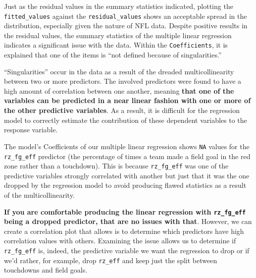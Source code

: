 \documentclass[
  letterpaper,
]{krantz}
\begin{document}
Just as the residual values in the summary statistics indicated,
plotting the \texttt{fitted\_values} against the
\texttt{residual\_values} shows an acceptable spread in the
distribution, especially given the nature of NFL data. Despite positive
results in the residual values, the summary statistics of the multiple
linear regression indicates a significant issue with the data. Within
the \texttt{Coefficients}, it is explained that one of the items is
``not defined because of singularities.''

\begin{tcolorbox}[enhanced jigsaw, left=2mm, toprule=.15mm, opacitybacktitle=0.6, leftrule=.75mm, bottomrule=.15mm, colbacktitle=quarto-callout-important-color!10!white, breakable, colback=white, bottomtitle=1mm, toptitle=1mm, title=\textcolor{quarto-callout-important-color}{\faExclamation}\hspace{0.5em}{Important}, coltitle=black, titlerule=0mm, arc=.35mm, opacityback=0, colframe=quarto-callout-important-color-frame, rightrule=.15mm]

``Singularities'' occur in the data as a result of the dreaded
multicollinearity between two or more predictors. The involved
predictors were found to have a high amount of correlation between one
another, meaning \textbf{that one of the variables can be predicted in a
near linear fashion with one or more of the other predictive variables}.
As a result, it is difficult for the regression model to correctly
estimate the contribution of these dependent variables to the response
variable.

The model's Coefficients of our multiple linear regression shows
\texttt{NA} values for the \texttt{rz\_fg\_eff} predictor (the
percentage of times a team made a field goal in the red zone rather than
a touchdown). This is because \texttt{rz\_fg\_eff} was one of the
predictive variables strongly correlated with another but just that it
was the one dropped by the regression model to avoid producing flawed
statistics as a result of the multicollinearity.

\textbf{If you are comfortable producing the linear regression with
\texttt{rz\_fg\_eff}} \textbf{being a dropped predictor, that are no
issues with that}. However, we can create a correlation plot that allows
is to determine which predictors have high correlation values with
others. Examining the issue allows us to determine if
\texttt{rz\_fg\_eff} is, indeed, the predictive variable we want the
regression to drop or if we'd rather, for example, drop \texttt{rz\_eff}
and keep just the split between touchdowns and field goals.


\end{tcolorbox}
\end{document}
